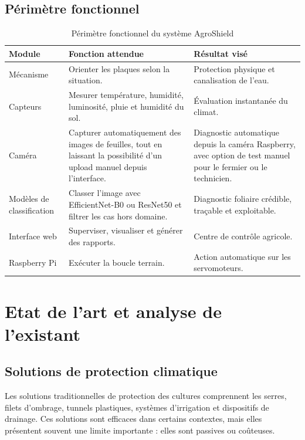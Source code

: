 ﻿\documentclass[11pt,a4paper,openany]{report}
\begin{document}
\section{Périmètre fonctionnel}
\begin{table}[H]
\centering
\small
\renewcommand{\arraystretch}{1.3}

\begin{tabular}{|p{2.8cm}|p{5.2cm}|p{5.2cm}|}
\hline
\textbf{Module} &
\textbf{Fonction attendue} &
\textbf{Résultat visé} \\
\hline

Mécanisme &
Orienter les plaques selon la situation. &
Protection physique et canalisation de l'eau. \\
\hline

Capteurs &
Mesurer température, humidité, luminosité, pluie et humidité du sol. &
Évaluation instantanée du climat. \\
\hline

Caméra &
Capturer automatiquement des images de feuilles, tout en laissant la possibilité d'un upload manuel depuis l'interface. &
Diagnostic automatique depuis la caméra Raspberry, avec option de test manuel pour le fermier ou le technicien. \\
\hline

Modèles de classification &
Classer l'image avec EfficientNet-B0 ou ResNet50 et filtrer les cas hors domaine. &
Diagnostic foliaire crédible, traçable et exploitable. \\
\hline

Interface web &
Superviser, visualiser et générer des rapports. &
Centre de contrôle agricole. \\
\hline

Raspberry Pi &
Exécuter la boucle terrain. &
Action automatique sur les servomoteurs. \\
\hline

\end{tabular}

\caption{Périmètre fonctionnel du système AgroShield}
\label{tab:perimetre}
\end{table}

\chapter{Etat de l'art et analyse de l'existant}
\section{Solutions de protection climatique}
Les solutions traditionnelles de protection des cultures comprennent les serres, filets d'ombrage, tunnels plastiques, systèmes d'irrigation et dispositifs de drainage. Ces solutions sont efficaces dans certains contextes, mais elles présentent souvent une limite importante : elles sont passives ou coûteuses.
\end{document}
